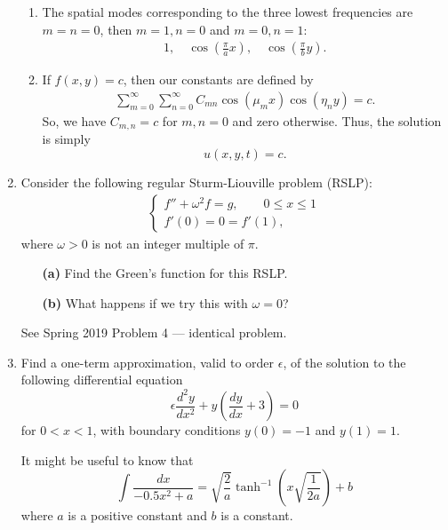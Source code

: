 \documentclass[10pt,letterpaper]{report}
\begin{document}
\begin{enumerate}
\begin{enumerate}
\item The spatial modes corresponding to the three lowest frequencies are $m = n = 0$, then $m = 1, n = 0$ and $m = 0, n = 1$:
\begin{align*}
    1, \quad \cos\left(\frac{\pi}{a}x\right), \quad \cos\left(\frac{\pi}{b}y\right).
\end{align*}

\item If $f(x, y) = c$, then our constants are defined by
\begin{align*}
    \sum_{m = 0}^\infty\sum_{n = 0}^\infty C_{mn} \cos(\mu_m x)\cos(\eta_n y) = c.
\end{align*}
So, we have $C_{m,n} = c$ for $m, n = 0$ and zero otherwise. Thus, the solution is simply
\[
u(x, y, t) = c.
\]

\end{enumerate}

\item \begin{qbox}
Consider the following regular Sturm-Liouville problem (RSLP):
\begin{align*}
    \begin{cases}
    f'' + \omega^2 f = g, \qquad 0 \leq x \leq 1 \\
    f'(0) = 0 = f'(1),
    \end{cases}
\end{align*}
where $\omega > 0$ is not an integer multiple of $\pi$.
\begin{itemize}
\item[\textbf{(a)}] Find the Green's function for this RSLP.
\item[\textbf{(b)}] What happens if we try this with $\omega = 0$?
\end{itemize}
\end{qbox}

See Spring 2019 Problem 4 --- identical problem.

\item \begin{qbox}
Find a one-term approximation, valid to order $\epsilon$, of the solution to the following differential equation
\[
\epsilon\frac{d^2y}{dx^2} + y\left(\frac{dy}{dx} + 3\right) = 0
\]
for $0 < x < 1$, with boundary conditions $y(0) = -1$ and $y(1) = 1$. 

It might be useful to know that
\[
\int\frac{dx}{-0.5x^2+a} = \sqrt{\frac{2}{a}}\tanh^{-1}\left(x\sqrt{\frac{1}{2a}}\right) + b
\]
where $a$ is a positive constant and $b$ is a constant.


\end{qbox}
\end{enumerate}
\end{document}
